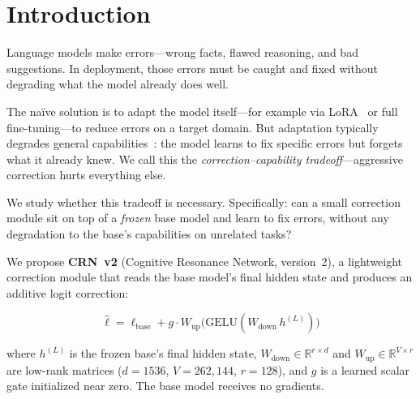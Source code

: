 \documentclass[11pt]{article}
\begin{document}
\section{Introduction}
\label{sec:intro}

Language models make errors---wrong facts, flawed reasoning, and bad suggestions.
In deployment, those errors must be caught and fixed without degrading what the model already does well.

The na\"ive solution is to adapt the model itself---for example via LoRA~\cite{lora} or full fine-tuning---to reduce errors on a target domain.
But adaptation typically degrades general capabilities~\cite{mccloskey1989catastrophic,kirkpatrick2017episodic,li2018algorithmic}: the model learns to fix specific errors but forgets what it already knew.
We call this the \emph{correction--capability tradeoff}---aggressive correction hurts everything else.

We study whether this tradeoff is necessary.
Specifically: can a small correction module sit on top of a \emph{frozen} base model and learn to fix errors, without any degradation to the base's capabilities on unrelated tasks?

We propose \textbf{CRN~v2} (Cognitive Resonance Network, version~2), a lightweight correction module that reads the base model's final hidden state and produces an additive logit correction:

\begin{equation}
\hat{\ell} = \ell_{\text{base}} + g \cdot W_{\text{up}}\!\big(\text{GELU}(W_{\text{down}}\,h^{(L)})\big)
\label{eq:crn_v2}
\end{equation}

where $h^{(L)}$ is the frozen base's final hidden state, $W_{\text{down}} \in \mathbb{R}^{r \times d}$ and $W_{\text{up}} \in \mathbb{R}^{V \times r}$ are low-rank matrices ($d{=}1536$, $V{=}262{,}144$, $r{=}128$), and $g$ is a learned scalar gate initialized near zero.
The base model receives no gradients.
\end{document}
